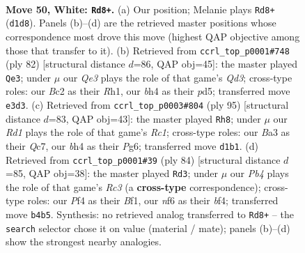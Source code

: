 \documentclass[11pt]{article}
\begin{document}
\clearpage

\begin{figure}[p]\centering
\begin{subfigure}{0.46\textwidth}\centering
\resizebox{\linewidth}{!}{%
\newchessgame
\chessboard[
  setfen={qrb4k/p1p2pp1/1p3n2/7p/1P3P1b/B3Q2P/P1B3P1/3R3K w - - 7 50},
  showmover=false,
  pgfstyle=straightmove, color=movearrow, markmove={d1-d8}
]}
\caption{}
\end{subfigure}\hfill
\begin{subfigure}{0.46\textwidth}\centering
\resizebox{\linewidth}{!}{%
\newchessgame
\chessboard[
  setfen={5nk1/q6r/3bp1p1/pB1p1pP1/P2P3P/3Q4/3B1PK1/7R w - - 10 42},
  showmover=false,
  pgfstyle=straightmove, color=movearrow, markmove={d3-e3}
]}
\caption{}
\end{subfigure}
\\[4pt]
\begin{subfigure}{0.46\textwidth}\centering
\resizebox{\linewidth}{!}{%
\newchessgame
\chessboard[
  setfen={2r5/2qb1kb1/5pp1/3Pp3/n1p1P3/1p2BR1P/1P4PK/1B1NQ3 b - - 23 48},
  showmover=false,
  pgfstyle=straightmove, color=movearrow, markmove={c8-h8}
]}
\caption{}
\end{subfigure}\hfill
\begin{subfigure}{0.46\textwidth}\centering
\resizebox{\linewidth}{!}{%
\newchessgame
\chessboard[
  setfen={r2q4/3r1pk1/P4n2/4pP1p/4PbpP/2R5/4Q3/R3BB1K w - - 5 43},
  showmover=false,
  pgfstyle=straightmove, color=movearrow, markmove={c3-d3}
]}
\caption{}
\end{subfigure}
\caption{\textbf{Move 50, White: \texttt{Rd8+}.} (a) Our position; Melanie plays \texttt{Rd8+} (\texttt{d1d8}). Panels (b)--(d) are the retrieved master positions whose correspondence most drove this move (highest QAP objective among those that transfer to it). (b) Retrieved from \texttt{ccrl\_top\_p0001\#748} (ply 82) [structural distance $d$=86, QAP obj=45]: the master played \texttt{Qe3}; under $\mu$ our \emph{Qe3} plays the role of that game's \emph{Qd3}; cross-type roles: our \emph{B}c2 as their \emph{R}h1, our \emph{b}h4 as their \emph{p}d5; transferred move \texttt{e3d3}. (c) Retrieved from \texttt{ccrl\_top\_p0003\#804} (ply 95) [structural distance $d$=83, QAP obj=43]: the master played \texttt{Rh8}; under $\mu$ our \emph{Rd1} plays the role of that game's \emph{Rc1}; cross-type roles: our \emph{B}a3 as their \emph{Q}c7, our \emph{b}h4 as their \emph{P}g6; transferred move \texttt{d1b1}. (d) Retrieved from \texttt{ccrl\_top\_p0001\#39} (ply 84) [structural distance $d$=85, QAP obj=38]: the master played \texttt{Rd3}; under $\mu$ our \emph{Pb4} plays the role of that game's \emph{Rc3} (a \textbf{cross-type} correspondence); cross-type roles: our \emph{P}f4 as their \emph{B}f1, our \emph{n}f6 as their \emph{b}f4; transferred move \texttt{b4b5}. Synthesis: no retrieved analog transferred to \texttt{Rd8+} -- the \texttt{search} selector chose it on value (material / mate); panels (b)--(d) show the strongest nearby analogies.}
\label{fig:thought-m98}
\end{figure}
\end{document}
